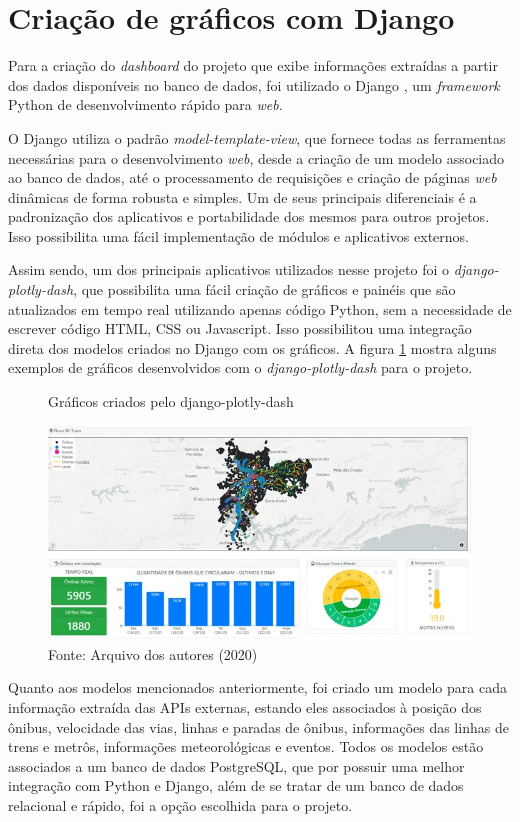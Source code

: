\section{Criação de gráficos com Django}
\indent
\par Para a criação do \textit{dashboard} do projeto que exibe informações extraídas a partir dos dados disponíveis no banco de dados, foi utilizado o Django \cite{Django}, um \textit{framework} Python de desenvolvimento rápido para \textit{web}.
\indent
\par O Django utiliza o padrão \textit{model-template-view}, que fornece todas as ferramentas necessárias para o desenvolvimento \textit{web}, desde a criação de um modelo associado ao banco de dados, até o processamento de requisições e criação de páginas \textit{web} dinâmicas de forma robusta e simples. Um de seus principais diferenciais é a padronização dos aplicativos e portabilidade dos mesmos para outros projetos. Isso possibilita uma fácil implementação de módulos e aplicativos externos.
\indent
\par Assim sendo, um dos principais aplicativos utilizados nesse projeto foi o \textit{django-plotly-dash}, que possibilita uma fácil criação de gráficos e painéis que são atualizados em tempo real utilizando apenas código Python, sem a necessidade de escrever código HTML, CSS ou Javascript. Isso possibilitou uma integração direta dos modelos criados no Django com os gráficos. A figura \ref{printDashboard} mostra alguns exemplos de gráficos desenvolvidos com o \textit{django-plotly-dash} para o projeto.

\begin{figure}[H]
    \centering
    \caption{Gráficos criados pelo django-plotly-dash}
    \includegraphics[width=1.0\linewidth]{Imagens/printDashboard.jpeg}
    \caption*{Fonte: Arquivo dos autores (2020)}
    \label{printDashboard}
\end{figure}
\indent
\par Quanto aos modelos mencionados anteriormente, foi criado um modelo para cada informação extraída das APIs externas, estando eles associados à posição dos ônibus, velocidade das vias, linhas e paradas de ônibus, informações das linhas de trens e metrôs, informações meteorológicas e eventos. Todos os modelos estão associados a um banco de dados PostgreSQL, que por possuir uma melhor integração com Python e Django, além de se tratar de um banco de dados relacional e rápido, foi a opção escolhida para o projeto.

